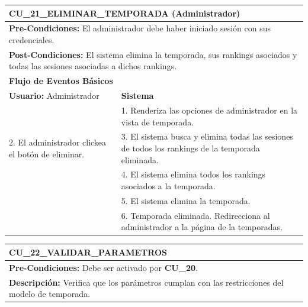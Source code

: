 \begin{center}
  \begin{tabular}{| p{7.5cm} | p{7.5cm} |}
    \hline
    \multicolumn{2}{|p{15cm}|}{\textbf{CU\_21\_ELIMINAR\_TEMPORADA} (Administrador)} \\ \hline
    \multicolumn{2}{|p{15cm}|}{\textbf{Pre-Condiciones:} El administrador debe haber iniciado sesión con sus credenciales.} \\ \hline
    \multicolumn{2}{|p{15cm}|}{\textbf{Post-Condiciones:} El sistema elimina la temporada, sus rankings asociados y todas las sesiones asociadas a dichos rankings.} \\ \hline
    \multicolumn{2}{|p{7.5cm}|}{\textbf{Flujo de Eventos Básicos}} \\ \hline
    \multicolumn{1}{|p{7.5cm}|}{\textbf{Usuario:} Administrador} & \multicolumn{1}{|p{7.5cm}|}{\textbf{Sistema}} \\ \hline
    
    \multicolumn{1}{|p{7.5cm}|}{} & 
    \multicolumn{1}{|p{7.5cm}|}{1. Renderiza las opciones de administrador en la vista de temporada.}\\ \hline
    
    \multicolumn{1}{|p{7.5cm}|}{2. El administrador clickea el botón de eliminar.}& 
    \multicolumn{1}{|p{7.5cm}|}{3. El sistema busca y elimina todas las sesiones de todos los rankings de la temporada eliminada.}\\ \hline
    
    \multicolumn{1}{|p{7.5cm}|}{} & 
    \multicolumn{1}{|p{7.5cm}|}{4. El sistema elimina todos los rankings asociados a la temporada.}\\ \hline
    
    \multicolumn{1}{|p{7.5cm}|}{} & 
    \multicolumn{1}{|p{7.5cm}|}{5. El sistema elimina la temporada.}\\ \hline
    
    \multicolumn{1}{|p{7.5cm}|}{} & 
    \multicolumn{1}{|p{7.5cm}|}{6. Temporada eliminada. Redirecciona al administrador a la página de la temporadas.}\\ \hline
  \end{tabular}
  
  \label{table:usecase:21}
\end{center}

\begin{center}
  \begin{tabular}{| p{7.5cm} | p{7.5cm} |}
    \hline
    \multicolumn{2}{|p{15cm}|}{\textbf{CU\_22\_VALIDAR\_PARAMETROS}} \\ \hline
    \multicolumn{2}{|p{15cm}|}{\textbf{Pre-Condiciones:} Debe ser activado por \textbf{CU\_20}.} \\ \hline
    \multicolumn{2}{|p{15cm}|}{\textbf{Descripción:} Verifica que los parámetros cumplan con las restricciones del modelo de temporada.} \\
    \hline
  \end{tabular}
  
  \label{table:usecase:22}
\end{center}

